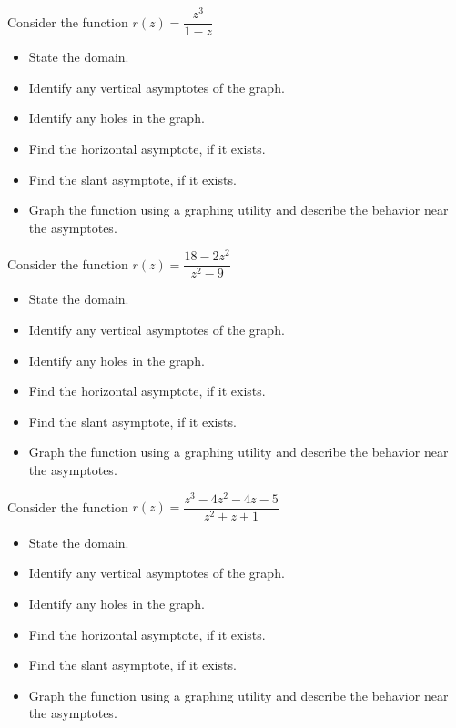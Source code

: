 \documentclass{ximera}
\begin{document}
\begin{problem}
Consider the function $r(z) = \dfrac{z^3}{1-z}$
\begin{itemize}
\item State the domain.
\item Identify any vertical asymptotes of the graph.
\item Identify any holes in the graph.
\item Find the horizontal asymptote, if it exists.
\item Find the slant asymptote, if it exists.
\item Graph the function using a graphing utility and describe the behavior near the asymptotes.
\end{itemize}
\end{problem} 

\begin{problem}
Consider the function $r(z) = \dfrac{18-2z^2}{z^2-9}$
\begin{itemize}
\item State the domain.
\item Identify any vertical asymptotes of the graph.
\item Identify any holes in the graph.
\item Find the horizontal asymptote, if it exists.
\item Find the slant asymptote, if it exists.
\item Graph the function using a graphing utility and describe the behavior near the asymptotes.
\end{itemize}
\end{problem}

\begin{problem}\label{alltheasymplast}
Consider the function $r(z) = \dfrac{z^3-4z^2-4z-5}{z^2+z+1}$ 
\begin{itemize}
\item State the domain.
\item Identify any vertical asymptotes of the graph.
\item Identify any holes in the graph.
\item Find the horizontal asymptote, if it exists.
\item Find the slant asymptote, if it exists.
\item Graph the function using a graphing utility and describe the behavior near the asymptotes.
\end{itemize}
\end{problem}
\end{document}
